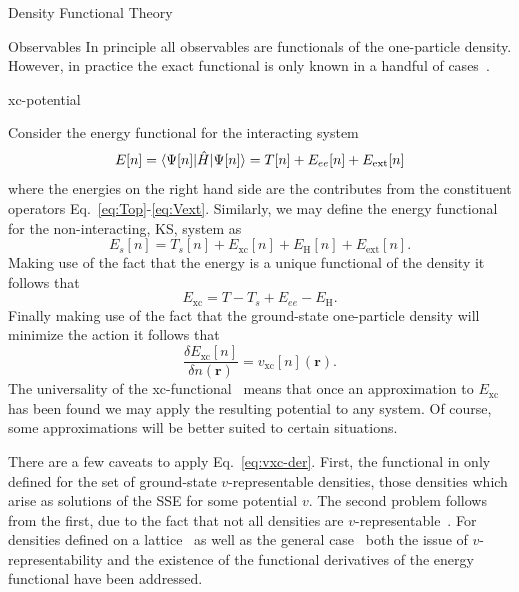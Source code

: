 \documentclass[letterpaper, 11 pt]{report}
\begin{document}
\begin{chapter}{Density Functional Theory \label{chap:dft}}
\begin{section}{Observables \label{sec:obs}}
      In principle all observables are functionals of the one-particle density. However, in practice the
      exact functional is only known in a handful of cases~\cite[p. 211-213]{obs_exac}.

   \end{section}

   \begin{section}{xc-potential \label{sec:xcpot}}

      Consider the energy functional for the interacting system
      \begin{equation} \label{eq:efunc}
         E[n] = \braket{\Psi[n] | \hat{H} | \Psi[n] }= T[n] + E_{ee}[n] + E_\mathrm{ext}[n]
      \end{equation}
      where the energies on the right hand side are the contributes from the constituent operators
      Eq.~\eqref{eq:Top}-\eqref{eq:Vext}. Similarly, we may define the energy functional for the
      non-interacting, KS, system as
      \begin{equation} \label{eq:esfunc}
         E_s[n] =  T_s[n] + E_\mathrm{xc}[n] + E_\mathrm{H}[n] + E_\mathrm{ext}[n].
      \end{equation}
      Making use of the fact that the energy is a unique functional of the density it follows that
      \begin{equation} \label{eq:exc}
         E_\mathrm{xc} = T - T_s + E_{ee} - E_\mathrm{H}.
      \end{equation}
      Finally making use of the fact that the ground-state one-particle density will minimize the action
      it follows that
      \begin{equation} \label{eq:vxc-der}
         \frac{\delta E_\mathrm{xc}[n]}{\delta n(\mathbf{r})} = v_\mathrm{xc}[n](\mathbf{r}).
      \end{equation}
      The universality of the xc-functional~\cite{dft-engel} means that once an approximation to
      $E_\mathrm{xc}$ has been found we may apply the resulting potential to any system. Of course,
      some approximations will be better suited to certain situations.

      There are a few caveats to apply Eq.~\eqref{eq:vxc-der}. First, the functional in only defined
      for the set of ground-state $v$-representable densities, those densities which arise as solutions
      of the SSE for some potential $v$. The second problem follows from the first, due to the fact
      that not all densities are $v$-representable~\cite{not-vrep1, not-vrep2, not-vrep3}. For densities
      defined on a lattice~\cite{vrep-lat} as well as the general case~\cite{nonint1, nonint2,
      vrep-levy1, vrep-levy2, vrep-lieb, vrep-rev} both the issue of $v$-representability and the
      existence of the functional derivatives of the energy functional have been addressed.


\end{section}
\end{chapter}
\end{document}
